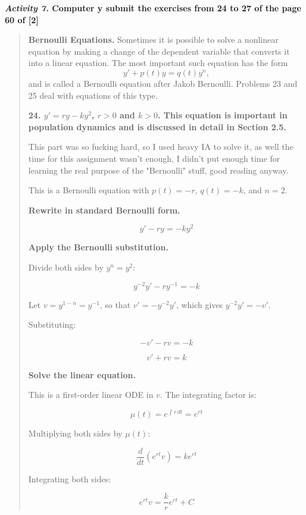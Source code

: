 \textbf{\textit{Activity 7. }Computer y submit the exercises from 24 to 27 of the page 60 of [2]}
\begin{quote}

\textbf{Bernoulli Equations.} Sometimes it is possible to solve a nonlinear equation by making a change of the dependent variable that converts it into a linear equation. The most important such equation has the form
\[
y' + p(t)y = q(t)y^n,
\]
and is called a Bernoulli equation after Jakob Bernoulli. Problems 23 and 25 deal with equations of this type.


\textbf{24. $y' = ry - ky^2$, $r > 0$ and $k > 0$. This equation is important in population dynamics and is discussed in detail in Section 2.5.}
\begin{respuesta}

\begin{theorem}
This part was so fucking hard, so I used heavy IA to solve it, as well the time for this assignment wasn't enough, I didn't put enough time for learning the real purpose of the "Bernoulli" stuff, good reading anyway. 
\end{theorem}
\vspace{0.5cm}


This is a Bernoulli equation with $p(t) = -r$, $q(t) = -k$, and $n = 2$.

\textbf{Rewrite in standard Bernoulli form.}

\[
y' - ry = -ky^2
\]

\textbf{Apply the Bernoulli substitution.}

Divide both sides by $y^n = y^2$:

\[
y^{-2}y' - ry^{-1} = -k
\]

Let $v = y^{1-n} = y^{-1}$, so that $v' = -y^{-2}y'$, which gives $y^{-2}y' = -v'$.

Substituting:

\[
-v' - rv = -k
\]

\[
v' + rv = k
\]

\textbf{Solve the linear equation.}

This is a first-order linear ODE in $v$. The integrating factor is:

\[
\mu(t) = e^{\int r\, dt} = e^{rt}
\]

Multiplying both sides by $\mu(t)$:

\[
\frac{d}{dt}\left(e^{rt}v\right) = ke^{rt}
\]

Integrating both sides:

\[
e^{rt}v = \frac{k}{r}e^{rt} + C
\]


\end{respuesta}
\end{quote}
